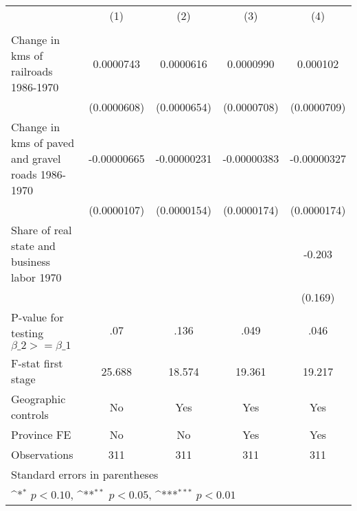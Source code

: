 {
\def\sym#1{\ifmmode^{#1}\else\(^{#1}\)\fi}
\begin{tabular}{l*{4}{c}}
\hline\hline
                &\multicolumn{1}{c}{(1)}&\multicolumn{1}{c}{(2)}&\multicolumn{1}{c}{(3)}&\multicolumn{1}{c}{(4)}\\
                &\multicolumn{1}{c}{}&\multicolumn{1}{c}{}&\multicolumn{1}{c}{}&\multicolumn{1}{c}{}\\
\hline
Change in kms of railroads 1986-1970&0.0000743         &0.0000616         &0.0000990         & 0.000102         \\
                &(0.0000608)         &(0.0000654)         &(0.0000708)         &(0.0000709)         \\
[1em]
Change in kms of paved and gravel roads 1986-1970&-0.00000665         &-0.00000231         &-0.00000383         &-0.00000327         \\
                &(0.0000107)         &(0.0000154)         &(0.0000174)         &(0.0000174)         \\
[1em]
Share of real state and business labor 1970&                  &                  &                  &   -0.203         \\
                &                  &                  &                  &  (0.169)         \\
\hline
P-value for testing $\beta\_{2} >= \beta\_{1}$&      .07         &     .136         &     .049         &     .046         \\
F-stat first stage&   25.688         &   18.574         &   19.361         &   19.217         \\
Geographic controls&       No         &      Yes         &      Yes         &      Yes         \\
Province FE     &       No         &       No         &      Yes         &      Yes         \\
Observations    &      311         &      311         &      311         &      311         \\
\hline\hline
\multicolumn{5}{l}{\footnotesize Standard errors in parentheses}\\
\multicolumn{5}{l}{\footnotesize \sym{*} \(p<0.10\), \sym{**} \(p<0.05\), \sym{***} \(p<0.01\)}\\
\end{tabular}
}
